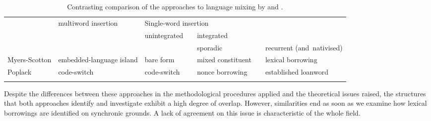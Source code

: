 \begin{table}
\begin{small}
\begin{tabular}{m{5em}m{5em}m{5em}lm{5em}lm{6em}} 
\midrule
\addlinespace[2mm]
{Author} &multiword insertion &  \multicolumn{5}{l}{Single-word insertion} \\
\addlinespace[2mm]
\cmidrule{3-3}
\cmidrule{5-7}
\addlinespace[2mm]
 & & {unintegrated} & & \multicolumn{3}{l}{integrated} \\
\addlinespace[2mm]
\cmidrule{5-5} 
\cmidrule{7-7}
\addlinespace[2mm]
  & & & & sporadic & & recurrent \mbox{(and nativised)} \\
\addlinespace[2mm]
\midrule
\addlinespace[2mm]
 Myers-Scotton &embedded-language island &bare form & &mixed constituent & & lexical \mbox{borrowing}\\
\addlinespace[2mm]
 Poplack &code-switch &code-switch & &nonce borrowing & & established loanword\\
\addlinespace[2mm]
\midrule
\end{tabular}
\end{small}
\caption{Contrasting comparison of the approaches to language mixing by \citet[][]{poplack18} and \citet[][]{myers-scotton-contact-2002}.}
\label{tab:1:2}
\end{table}

Despite the differences between these approaches in the methodological procedures applied and the theoretical issues raised, the structures that both approaches identify and investigate exhibit a high degree of overlap. However, similarities end as soon as we examine how lexical borrowings are identified on synchronic grounds. A lack of agreement on this issue is characteristic of the whole field.

